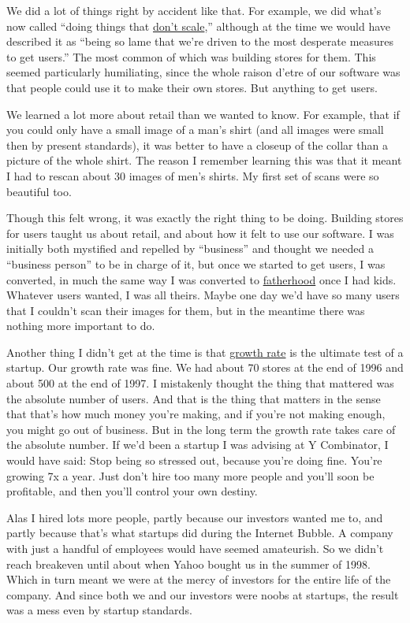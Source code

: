 \documentclass[12pt]{book}
\begin{document}
We did a lot of things right by accident like that. For example, we did
what's now called ``doing things that \href{ds.html}{don't scale},''
although at the time we would have described it as ``being so lame that
we're driven to the most desperate measures to get users.'' The most
common of which was building stores for them. This seemed particularly
humiliating, since the whole raison d'etre of our software was that
people could use it to make their own stores. But anything to get users.

We learned a lot more about retail than we wanted to know. For example,
that if you could only have a small image of a man's shirt (and all
images were small then by present standards), it was better to have a
closeup of the collar than a picture of the whole shirt. The reason I
remember learning this was that it meant I had to rescan about 30 images
of men's shirts. My first set of scans were so beautiful too.

Though this felt wrong, it was exactly the right thing to be doing.
Building stores for users taught us about retail, and about how it felt
to use our software. I was initially both mystified and repelled by
``business'' and thought we needed a ``business person'' to be in charge
of it, but once we started to get users, I was converted, in much the
same way I was converted to \href{kids.html}{fatherhood} once I had
kids. Whatever users wanted, I was all theirs. Maybe one day we'd have
so many users that I couldn't scan their images for them, but in the
meantime there was nothing more important to do.

Another thing I didn't get at the time is that \href{growth.html}{growth
rate} is the ultimate test of a startup. Our growth rate was fine. We
had about 70 stores at the end of 1996 and about 500 at the end of 1997.
I mistakenly thought the thing that mattered was the absolute number of
users. And that is the thing that matters in the sense that that's how
much money you're making, and if you're not making enough, you might go
out of business. But in the long term the growth rate takes care of the
absolute number. If we'd been a startup I was advising at Y Combinator,
I would have said: Stop being so stressed out, because you're doing
fine. You're growing 7x a year. Just don't hire too many more people and
you'll soon be profitable, and then you'll control your own destiny.

Alas I hired lots more people, partly because our investors wanted me
to, and partly because that's what startups did during the Internet
Bubble. A company with just a handful of employees would have seemed
amateurish. So we didn't reach breakeven until about when Yahoo bought
us in the summer of 1998. Which in turn meant we were at the mercy of
investors for the entire life of the company. And since both we and our
investors were noobs at startups, the result was a mess even by startup
standards.
\end{document}
